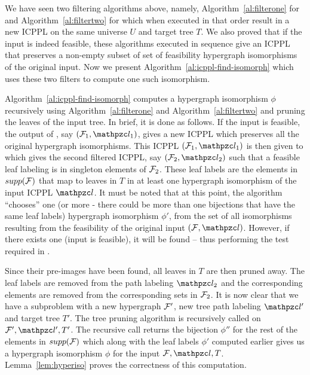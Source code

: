 We have seen two filtering algorithms above, namely,
Algorithm~\ref{al:filterone} for \filteri and
Algorithm~\ref{al:filtertwo} for \filterii which when executed
in that order result in a new ICPPL on the same universe $U$ and
target tree $T$. We also proved that if the input is indeed feasible,
these algorithms executed in sequence give an ICPPL that preserves a
non-empty subset of set of feasibility hypergraph isomorphisms of the
original input. %
Now we present Algorithm~\ref{al:icppl-find-isomorph} which uses these
two filters to compute one such isomorphism.



Algorithm~\ref{al:icppl-find-isomorph} computes a hypergraph
isomorphism $\phi$ recursively using Algorithm~\ref{al:filterone} and
Algorithm~\ref{al:filtertwo} and pruning the leaves of the input
tree. In brief, it is done as follows. If the input is feasible, the
output of \filteri, say $(\cF_1, \cl_1)$, gives a new ICPPL
which preserves all the original hypergraph isomorphisms.  This ICPPL
$(\cF_1, \cl_1)$ is then given to \filterii which gives the
second filtered ICPPL, say $(\cF_2, \cl_2)$ such that a feasible leaf
labeling is in singleton elements of ${\cal F}_2$. These leaf labels are
the elements in $supp({\cal F})$ that map to leaves in $T$ in at least one
hypergraph isomorphism of the input ICPPL $\cl$. It must be noted that
at this point, the algorithm ``chooses'' one (or more - there could be
more than one bijections that have the same leaf labels) hypergraph
isomorphism $\phi'$, from the set of all isomorphisms resulting from the
feasibility of the original input $(\cF, \cl)$. However, if there
exists one (\ie input is feasible), it will be found -- thus
performing the test required in \FTPL.

Since their pre-images have been found, all leaves in $T$ are then
pruned away. The leaf labels are removed from the path labeling
$\cl_2$ and the corresponding elements are removed from the
corresponding sets in ${\cal F}_2$. It is now clear that we have a
subproblem with a new hypergraph ${\cal F}'$, new tree path labeling $\cl'$
and target tree $T'$.  The tree pruning algorithm is recursively
called on $\cF', \cl', T'$. The recursive call returns the bijection
$\phi''$ for the rest of the elements in $supp({\cal F})$ which along with
the leaf labels $\phi'$ computed earlier gives us a hypergraph
isomorphism $\phi$ for the input $\cF,\cl,T$.  
Lemma~\ref{lem:hyperiso} proves the correctness of this computation.

